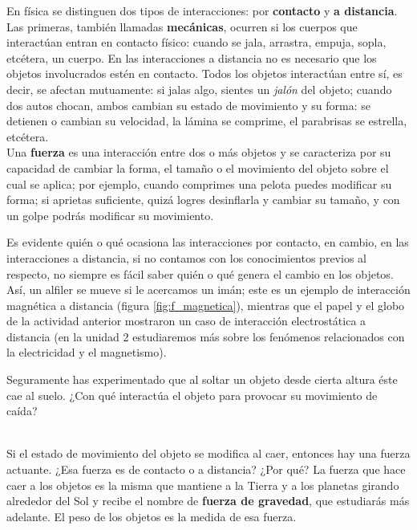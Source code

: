 \documentclass[11pt]{book}
\begin{document}
\begin{minipage}[t]{0.55\textwidth}

  En física se distinguen dos tipos de interacciones: por \textbf{contacto} y \textbf{a distancia}.
  Las primeras, también llamadas \textbf{mecánicas}, ocurren si los cuerpos que interactúan entran
  en contacto físico: cuando se jala, arrastra, empuja, sopla, etcétera, un cuerpo.
  En las interacciones a distancia no es necesario que los objetos involucrados estén en contacto.
  Todos los objetos interactúan entre sí, es decir, se afectan mutuamente: si jalas algo,
  sientes un \emph{jalón} del objeto; cuando dos autos chocan, ambos cambian su estado de movimiento
  y su forma: se detienen o cambian su velocidad, la lámina se comprime, el parabrisas se estrella,
  etcétera.\\

  Una \textbf{fuerza} es una interacción entre dos o más objetos y se caracteriza por su capacidad de
  cambiar la forma, el tamaño o el movimiento del objeto sobre el cual se aplica; por ejemplo,
  cuando comprimes una pelota puedes modificar su forma; si aprietas suficiente, quizá logres
  desinflarla y cambiar su tamaño, y con un golpe podrás modificar su movimiento.

  Es evidente quién o qué ocasiona las interacciones por contacto, en cambio, en las interacciones
  a distancia, si no contamos con los conocimientos previos al respecto, no siempre es fácil
  saber quién o qué genera el cambio en los objetos. Así, un alfiler se mueve si le acercamos
  un imán; este es un ejemplo de interacción magnética a distancia (figura \ref{fig:f_magnetica}),
  mientras que
  el papel y el globo de la actividad anterior mostraron un caso de interacción electrostática
  a distancia (en la unidad 2 estudiaremos más sobre los fenómenos relacionados con la electricidad
  y el magnetismo).

  Seguramente has experimentado que al soltar un objeto desde cierta altura éste cae al suelo.
  ¿Con qué interactúa el objeto para provocar su movimiento de caída?
\end{minipage}\\

Si el estado de movimiento
del objeto se modifica al caer, entonces hay una fuerza actuante. ¿Esa fuerza es de contacto o
a distancia? ¿Por qué?
La fuerza que hace caer a los objetos es la misma que mantiene a la Tierra y a los planetas
girando alrededor del Sol y recibe el nombre de \textbf{fuerza de gravedad}, que estudiarás más
adelante.
El peso de los objetos es la medida de esa fuerza.
\newpage
\end{document}
